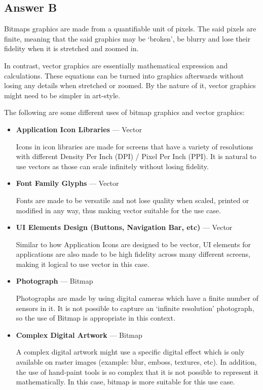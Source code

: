 \documentclass[
  11pt, %
]{assignment}
\begin{document}
\subsection*{Answer B}

Bitmaps graphics are made from a quantifiable unit of pixels. The said pixels are finite, meaning that the said graphics may be `broken', be blurry and lose their fidelity when it is stretched and zoomed in.

In contrast, vector graphics are essentially mathematical expression and calculations. These equations can be turned into graphics afterwards without losing any details when stretched or zoomed. By the nature of it, vector graphics might need to be simpler in art-style.

\medskip

The following are some different uses of bitmap graphics and vector graphics:

\begin{itemize}
      \item \textbf{Application Icon Libraries} — Vector

            Icons in icon libraries are made for screens that have a variety of resolutions with different Density Per Inch (DPI) / Pixel Per Inch (PPI). It is natural to use vectors as those can scale infinitely without losing fidelity.

      \item \textbf{Font Family Glyphs} — Vector

            Fonts are made to be versatile and not lose quality when scaled, printed or modified in any way, thus making vector suitable for the use case.

      \item \textbf{UI Elements Design (Buttons, Navigation Bar, etc)} — Vector

            Similar to how Application Icons are designed to be vector, UI elements for applications are also made to be high fidelity across many different screens, making it logical to use vector in this case.

      \item \textbf{Photograph} — Bitmap

            Photographs are made by using digital cameras which have a finite number of sensors in it. It is not possible to capture an `infinite resolution' photograph, so the use of Bitmap is appropriate in this context.

      \item \textbf{Complex Digital Artwork} — Bitmap

            A complex digital artwork might use a specific digital effect which is only available on raster images (example: blur, emboss, textures, etc). In addition, the use of hand-paint tools is so complex that it is not possible to represent it mathematically. In this case, bitmap is more suitable for this use case.

\end{itemize}
\end{document}
